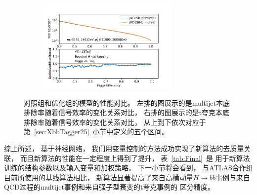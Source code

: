 \begin{figure}[htbp]
\begin{subfigure}{.5\textwidth}
    \caption{}
  \end{subfigure}
  \begin{subfigure}{.5\textwidth}
  \centering
   \includegraphics[width=0.75\textwidth]{figuresXbb/OPT/OPTopMASSPT3.pdf}
    \caption{}
  \end{subfigure}
  \caption{
对照组和优化组的模型的性能对比。
左排的图展示的是multijet本底排除率随着信号效率的变化关系对比，
右排的图展示的是t夸克本底排除率随着信号效率的变化关系对比，
从上到下依次对应于第~\ref{sec:XbbTagger25}~小节中定义的五个区间。
  }
  \label{fig:OPTROC}
\end{figure} 


综上所述，
基于神经网络，
我们用变量控制的方法成功实现了新算法的去质量关联，
而且新算法的性能在一定程度上得到了提升，
表~\ref{tab:Final}~是
用于新算法训练的结构参数以及输入变量和加权策略。
下一小节将会看到，
与ATLAS合作组目前所使用的基线算法相比，
新算法显著提高了来自高横动量$H\rightarrow b\bar{b}$事例与来自QCD过程的multijet事例和来自强子型衰变的t夸克事例的
区分精度。

